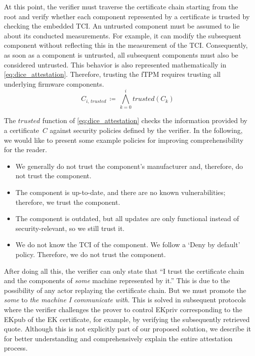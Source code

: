 At this point, the verifier must traverse the certificate chain starting from the root and verify whether each component represented by a certificate is trusted by checking the embedded TCI\@.
An untrusted component must be assumed to lie about its conducted measurements.
For example, it can modify the subsequent component without reflecting this in the measurement of the TCI\@.
Consequently, as soon as a component is untrusted, all subsequent components must also be considered untrusted.
This behavior is also represented mathematically in \autoref{eq:dice_attestation}.
Therefore, trusting the fTPM requires trusting all underlying firmware components.
\begin{equation}
    \label{eq:dice_attestation}
    C_{i, \, trusted} \, \coloneqq \, \bigwedge_{k=0}^{i} trusted(C_{k})
\end{equation}


The \(trusted\) function of \autoref{eq:dice_attestation} checks the information provided by a certificate~\(C\) against security policies defined by the verifier.
In the following, we would like to present some example policies for improving comprehensibility for the reader.

\begin{itemize}
    \item We generally do not trust the component's manufacturer and, therefore, do not trust the component.
    \item The component is up-to-date, and there are no known vulnerabilities; therefore, we trust the component.
    \item The component is outdated, but all updates are only functional instead of security-relevant, so we still trust it.
    \item We do not know the TCI of the component. We follow a `Deny by default' policy. Therefore, we do not trust the component.
\end{itemize}

After doing all this, the verifier can only state that ``I trust the certificate chain and the components of \emph{some} machine represented by it.''
This is due to the possibility of any actor replaying the certificate chain.
But we must promote the \emph{some} to \emph{the machine I communicate with}.
This is solved in subsequent protocols where the verifier challenges the prover to control EKpriv corresponding to the EKpub of the EK certificate, for example, by verifying the subsequently retrieved quote.
Although this is not explicitly part of our proposed solution, we describe it for better understanding and comprehensively explain the entire attestation process.

